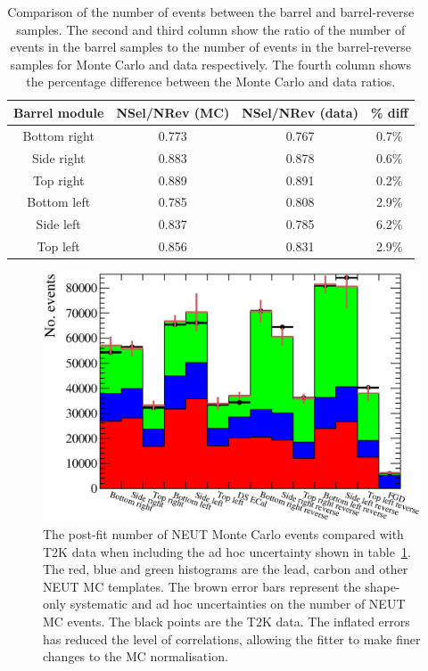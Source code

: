 \begin{table}
  \begin{tabular}{c c c c }
    Barrel module & NSel/NRev (MC) & NSel/NRev (data) & \% diff \\ \hline \hline
    Bottom right & 0.773 & 0.767 & 0.7\% \\
    Side right & 0.883 & 0.878 & 0.6\% \\
    Top right & 0.889 & 0.891 & 0.2\% \\
    Bottom left & 0.785 & 0.808 & 2.9\% \\
    Side left & 0.837 & 0.785 & 6.2\% \\
    Top left & 0.856 & 0.831 & 2.9\% \\
  \end{tabular}
  \caption{Comparison of the number of events between the barrel and barrel-reverse samples.  The second and third column show the ratio of the number of events in the barrel samples to the number of events in the barrel-reverse samples for Monte Carlo and data respectively.  The fourth column shows the percentage difference between the Monte Carlo and data ratios.}
  \label{table:NSelToNRevRatio}
\end{table}
\begin{figure}
  \centering
  \includegraphics[width=15cm]{images/measurement/data/MCTemplatesWithSystematics_T2KData_PostFit_WithErrorFudge.eps}
  \caption{The post-fit number of NEUT Monte Carlo events compared with T2K data when including the ad hoc uncertainty shown in table~\ref{table:NSelToNRevRatio}.  The red, blue and green histograms are the lead, carbon and other NEUT MC templates.  The brown error bars represent the shape-only systematic and ad hoc uncertainties on the number of NEUT MC events.  The black points are the T2K data.  The inflated errors has reduced the level of correlations, allowing the fitter to make finer changes to the MC normalisation.}
  \label{fig:MCTemplatesWithSystematicsT2KDataPostFitWithFudge}
\end{figure}
